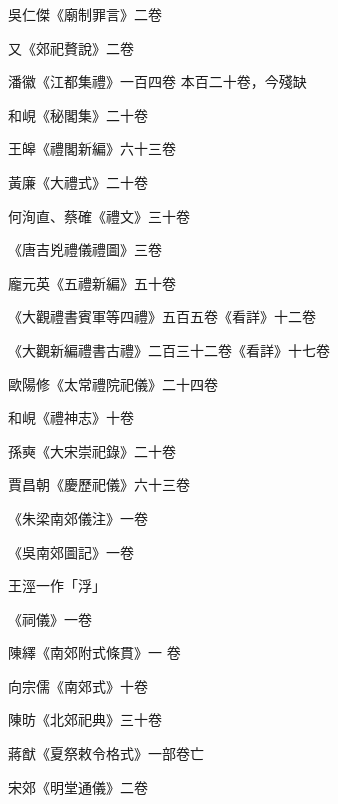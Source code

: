 \begin{pinyinscope}
 吳仁傑《廟制罪言》二卷



 又《郊祀贅說》二卷



 潘徽《江都集禮》一百四卷
 本百二十卷，今殘缺



 和峴《秘閣集》二十卷



 王皞《禮閣新編》六十三卷



 黃廉《大禮式》二十卷



 何洵直、蔡確《禮文》三十卷



 《唐吉兇禮儀禮圖》三卷



 龐元英《五禮新編》五十卷



 《大觀禮書賓軍等四禮》五百五卷《看詳》十二卷



 《大觀新編禮書古禮》二百三十二卷《看詳》十七卷



 歐陽修《太常禮院祀儀》二十四卷



 和峴《禮神志》十卷



 孫奭《大宋崇祀錄》二十卷



 賈昌朝《慶歷祀儀》六十三卷



 《朱梁南郊儀注》一卷



 《吳南郊圖記》一卷



 王涇一作「浮」



 《祠儀》一卷



 陳繹《南郊附式條貫》一
 卷



 向宗儒《南郊式》十卷



 陳昉《北郊祀典》三十卷



 蔣猷《夏祭敕令格式》一部卷亡



 宋郊《明堂通儀》二卷




\end{pinyinscope}
